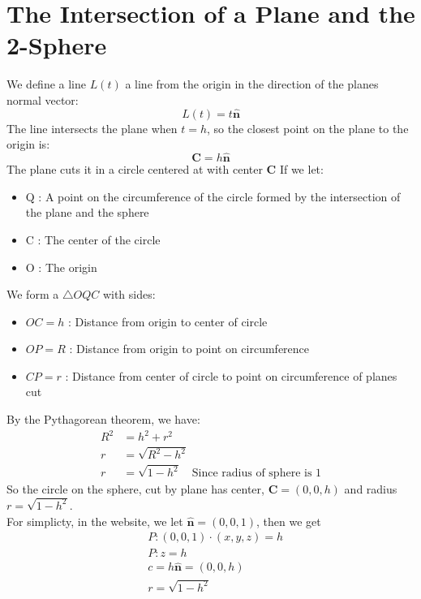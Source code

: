 \documentclass[11pt]{article}
\begin{document}
\section*{The Intersection of a Plane and the 2-Sphere}
We define a line $L(t)$ a line from the origin in the direction of the planes normal vector:
$$L(t) = t \hat{\textbf{n}}$$
The line intersects the plane when $t= h$, so the closest point on the plane to the origin is:
$$\mathbf{C} = h \hat{\mathbf{n}}
$$
The plane cuts it in a circle centered at with center $\mathbf{C}$
If we let:
\begin{itemize}
    \item Q : A point on the circumference of the circle formed by the intersection of the plane and the sphere
    \item C : The center of the circle
    \item O : The origin
\end{itemize}
We form a $\triangle OQC$ with sides:
\begin{itemize}
    \item $OC = h$ : Distance from origin to center of circle
    \item $OP = R$ : Distance from origin to point on circumference
    \item $CP = r$ : Distance from center of circle to point on circumference of planes cut
\end{itemize}
By the Pythagorean theorem, we have:
\begin{align*}
    R^2 & = h^2 + r^2                                               \\
    r   & = \sqrt{R^2 - h^2}                                        \\
    r   & = \sqrt{1 - h^2} \quad \text{Since radius of sphere is 1}
\end{align*}
So the circle on the sphere, cut by plane has center, $\mathbf{C} = (0,0,h)$ and radius $r = \sqrt{1 - h^2}$. \\
For simplicty, in the website, we let $\hat{\textbf{n}} = (0,0,1)$, then we get
\begin{align*}
     & P : (0,0,1) \cdot (x,y,z) = h    \\
     & P : z = h                        \\[1ex]
     & c = h \hat{\textbf{n}} = (0,0,h) \\
     & r = \sqrt{1 - h^2}
\end{align*}
\end{document}
